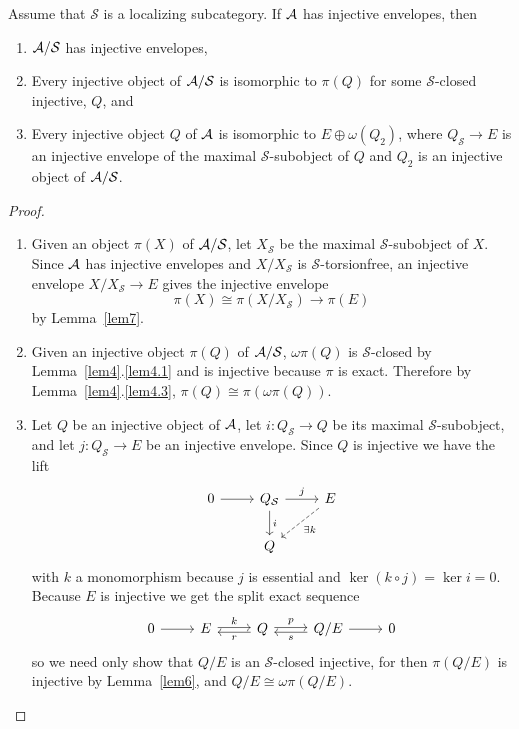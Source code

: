 \documentclass[dissertation.tex]{subfiles}
\begin{document}
\begin{prop}\label{prop1}
  Assume that $\mathcal{S}$ is a localizing subcategory.
  If $\mathcal{A}$ has injective envelopes, then
  \begin{enumerate}
  \item
    $\mathcal{A}/\mathcal{S}$ has injective envelopes,
  \item
    Every injective object of $\mathcal{A}/\mathcal{S}$ is isomorphic to $\pi(Q)$ for some $\mathcal{S}$-closed injective, $Q$, and
  \item
    Every injective object $Q$ of $\mathcal{A}$ is isomorphic to $E \oplus \omega(Q_2)$, where $Q_\mathcal{S} \rightarrow E$ is an injective envelope of the maximal $\mathcal{S}$-subobject of $Q$ and $Q_2$ is an injective object of $\mathcal{A}/\mathcal{S}$.
  \end{enumerate}
  
  \begin{proof}
    \begin{enumerate}
    \item
      Given an object $\pi(X)$ of $\mathcal{A}/\mathcal{S}$, let $X_\mathcal{S}$ be the maximal $\mathcal{S}$-subobject of $X$.
      Since $\mathcal{A}$ has injective envelopes and $X/X_\mathcal{S}$ is $\mathcal{S}$-torsionfree, an injective envelope $X/X_\mathcal{S} \rightarrow E$ gives the injective envelope
      $$\pi(X) \cong \pi(X/X_\mathcal{S}) \rightarrow \pi(E)$$
      by Lemma~\ref{lem7}.
    \item
      Given an injective object $\pi(Q)$ of $\mathcal{A}/\mathcal{S}$, $\omega\pi(Q)$ is $\mathcal{S}$-closed by Lemma~\ref{lem4}.\ref{lem4.1} and is injective because $\pi$ is exact.
      Therefore by Lemma~\ref{lem4}.\ref{lem4.3}, $\pi(Q) \cong \pi(\omega\pi(Q))$.
    \item
      Let $Q$ be an injective object of $\mathcal{A}$, let $i \colon Q_\mathcal{S} \rightarrow Q$ be its maximal $\mathcal{S}$-subobject, and let $j \colon Q_\mathcal{S} \rightarrow E$ be an injective envelope.
      Since $Q$ is injective we have the lift
      $$\begin{tikzcd}
        0 \arrow{r} & Q_\mathcal{S} \arrow{r}{j} \arrow{d}{i}& E \arrow[dashed]{ld}{\exists k}\\
        & Q
      \end{tikzcd}$$
      with $k$ a monomorphism because $j$ is essential and $\ker{(k \circ j)} = \ker{i} = 0$.
      Because $E$ is injective we get the split exact sequence
      $$\begin{tikzcd}
        0 \arrow{r} & E \arrow[shift left=0.5]{r}{k} & Q \arrow[shift left=0.5]{r}{p}\arrow[shift left=0.5ex]{l}{r} & Q/E \arrow[shift left=0.5ex]{l}{s} \arrow{r} & 0
      \end{tikzcd}$$
      so we need only show that $Q/E$ is an $\mathcal{S}$-closed injective, for then $\pi(Q/E)$ is injective by Lemma~\ref{lem6}, and $Q/E \cong \omega\pi(Q/E)$. 
      

\end{enumerate}
\end{proof}
\end{prop}
\end{document}
